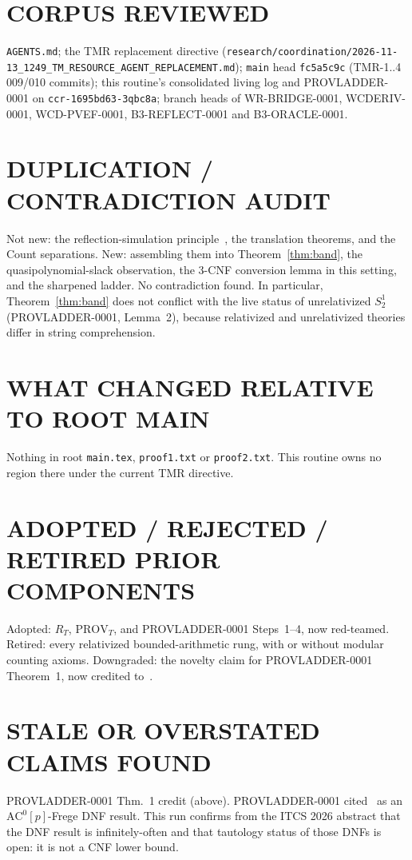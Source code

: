 \documentclass[11pt]{article}
\theoremstyle{definition}
\begin{document}
\section*{CORPUS REVIEWED}
\texttt{AGENTS.md}; the TMR replacement directive (\texttt{research/coordination/2026-11-13\_1249\_TM\_RESOURCE\_AGENT\_REPLACEMENT.md});
\texttt{main} head \texttt{fc5a5c9c} (TMR-1..4 009/010 commits); this routine's consolidated living log and PROVLADDER-0001 on
\texttt{ccr-1695bd63-3qbc8a}; branch heads of WR-BRIDGE-0001, WCDERIV-0001, WCD-PVEF-0001, B3-REFLECT-0001 and B3-ORACLE-0001.

\section*{DUPLICATION / CONTRADICTION AUDIT}
Not new: the reflection-simulation principle~\cite{KP89}, the translation theorems, and the Count separations. New: assembling them
into Theorem~\ref{thm:band}, the quasipolynomial-slack observation, the 3-CNF conversion lemma in this setting, and the sharpened ladder.
No contradiction found. In particular, Theorem~\ref{thm:band} does not conflict with the live status of unrelativized $S^1_2$
(PROVLADDER-0001, Lemma~2), because relativized and unrelativized theories differ in string comprehension.

\section*{WHAT CHANGED RELATIVE TO ROOT MAIN}
Nothing in root \texttt{main.tex}, \texttt{proof1.txt} or \texttt{proof2.txt}. This routine owns no region there under the current TMR directive.

\section*{ADOPTED / REJECTED / RETIRED PRIOR COMPONENTS}
Adopted: $R_T$, $\mathrm{PROV}_T$, and PROVLADDER-0001 Steps~1--4, now red-teamed. Retired: every relativized bounded-arithmetic rung,
with or without modular counting axioms. Downgraded: the novelty claim for PROVLADDER-0001 Theorem~1, now credited to~\cite{KP89}.

\section*{STALE OR OVERSTATED CLAIMS FOUND}
PROVLADDER-0001 Thm.~1 credit (above). PROVLADDER-0001 cited~\cite{LST25} as an $\mathrm{AC}^0[p]$-Frege DNF result. This run confirms
from the ITCS 2026 abstract that the DNF result is infinitely-often and that tautology status of those DNFs is open: it is not a CNF lower bound.
\end{document}

